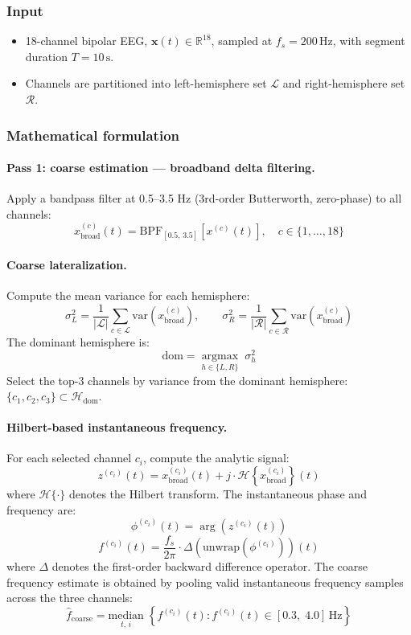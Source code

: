 \subsubsection{Input}

\begin{itemize}
  \item 18-channel bipolar EEG, $\mathbf{x}(t) \in \mathbb{R}^{18}$, sampled at $f_s = 200\,\mathrm{Hz}$, with segment duration $T = 10\,\mathrm{s}$.
  \item Channels are partitioned into left-hemisphere set $\mathcal{L}$ and right-hemisphere set $\mathcal{R}$.
\end{itemize}

\subsubsection{Mathematical formulation}

\paragraph{Pass 1: coarse estimation --- broadband delta filtering.}
Apply a bandpass filter at 0.5--3.5 Hz (3rd-order Butterworth, zero-phase) to all channels:
\[ x_{\mathrm{broad}}^{(c)}(t) = \mathrm{BPF}_{[0.5,\, 3.5]}\!\left[x^{(c)}(t)\right], \quad c \in \{1,\ldots,18\} \tag{1} \]

\paragraph{Coarse lateralization.}
Compute the mean variance for each hemisphere:
\[ \sigma_L^2 = \frac{1}{|\mathcal{L}|} \sum_{c \in \mathcal{L}} \mathrm{var}\!\left(x_{\mathrm{broad}}^{(c)}\right), \qquad \sigma_R^2 = \frac{1}{|\mathcal{R}|} \sum_{c \in \mathcal{R}} \mathrm{var}\!\left(x_{\mathrm{broad}}^{(c)}\right) \tag{2} \]
The dominant hemisphere is:
\[ \mathrm{dom} = \underset{h \in \{L, R\}}{\operatorname{argmax}}\; \sigma_h^2 \tag{3} \]
Select the top-3 channels by variance from the dominant hemisphere: $\{c_1, c_2, c_3\} \subset \mathcal{H}_{\mathrm{dom}}$.

\paragraph{Hilbert-based instantaneous frequency.}
For each selected channel $c_i$, compute the analytic signal:
\[ z^{(c_i)}(t) = x_{\mathrm{broad}}^{(c_i)}(t) + j \cdot \mathcal{H}\!\left\{x_{\mathrm{broad}}^{(c_i)}\right\}(t) \tag{4} \]
where $\mathcal{H}\{\cdot\}$ denotes the Hilbert transform. The instantaneous phase and frequency are:
\[ \phi^{(c_i)}(t) = \arg\!\left(z^{(c_i)}(t)\right) \tag{5} \]
\[ f^{(c_i)}(t) = \frac{f_s}{2\pi} \cdot \Delta\!\left(\mathrm{unwrap}\!\left(\phi^{(c_i)}\right)\right)(t) \tag{6} \]
where $\Delta$ denotes the first-order backward difference operator. The coarse frequency estimate is obtained by pooling valid instantaneous frequency samples across the three channels:
\[ \hat{f}_{\mathrm{coarse}} = \underset{t,\, i}{\mathrm{median}}\;\left\{f^{(c_i)}(t) : f^{(c_i)}(t) \in [0.3,\; 4.0]\,\mathrm{Hz}\right\} \tag{7} \]

